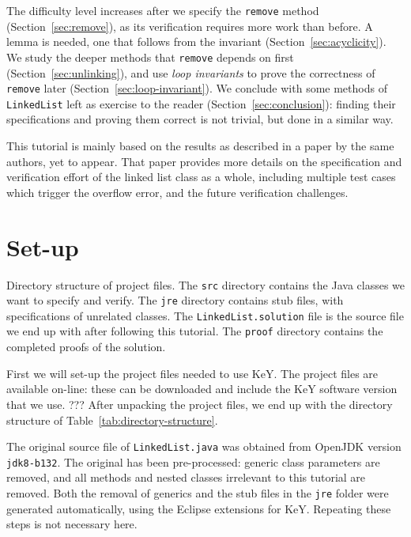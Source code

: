 \documentclass[runningheads]{llncs}
\begin{document}
The difficulty level increases after we specify the \texttt{remove} method (Section~\ref{sec:remove}), as its verification requires more work than before. A lemma is needed, one that follows from the invariant (Section~\ref{sec:acyclicity}). We study the deeper methods that \texttt{remove} depends on first (Section~\ref{sec:unlinking}), and use \emph{loop invariants} to prove the correctness of \texttt{remove} later (Section~\ref{sec:loop-invariant}). We conclude with some methods of \texttt{LinkedList} left as exercise to the reader (Section~\ref{sec:conclusion}): finding their specifications and proving them correct is not trivial, but done in a similar way.

This tutorial is mainly based on the results as described in a paper \cite{hiep2019verifying} by the same authors, yet to appear. That paper provides more details on the specification and verification effort of the linked list class as a whole, including multiple test cases which trigger the overflow error, and the future verification challenges.

\section{Set-up}\label{sec:setup}

\begin{table}[]
\medskip
    \caption{Directory structure of project files. The \texttt{src} directory contains the Java classes we want to specify and verify. The \texttt{jre} directory contains stub files, with specifications of unrelated classes. The \texttt{LinkedList.solution} file is the source file we end up with after following this tutorial. The \texttt{proof} directory contains the completed proofs of the solution.}
    \label{tab:directory-structure}
\end{table}

First we will set-up the project files needed to use KeY. The project files are available on-line: these can be downloaded and include the KeY software version that we use. ??? After unpacking the project files, we end up with the directory structure of Table~\ref{tab:directory-structure}.

The original source file of \texttt{LinkedList.java} was obtained from OpenJDK version \texttt{jdk8-b132}. The original has been pre-processed: generic class parameters are removed, and all methods and nested classes irrelevant to this tutorial are removed. Both the removal of generics and the stub files in the \texttt{jre} folder were generated automatically, using the Eclipse extensions for KeY. Repeating these steps is not necessary here.
\end{document}
